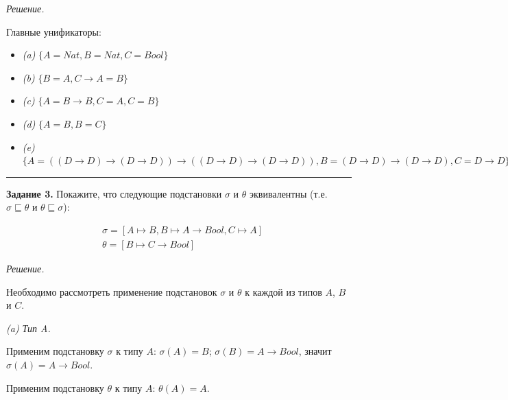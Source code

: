 \documentclass[landscape, 11pt]{report}
\begin{document}
	\textit{Решение.}	
	
	\vspace{0.2cm}
	
	Главные унификаторы:
	
	\begin{itemize}
		\item[] \textit{(a)} $\{A = Nat, B = Nat, C = Bool\}$
		\item[] \textit{(b)} $\{B =A, C \rightarrow A = B\}$
		\item[] \textit{(c)} $\{A = B \rightarrow B, C = A, C = B\}$
		\item[] \textit{(d)} $\{A = B, B = C\}$
		\item[] \textit{(e)} $\{A = \left((D \rightarrow D) \rightarrow (D \rightarrow D)\right) \rightarrow \left((D \rightarrow D) \rightarrow (D \rightarrow D)\right), B = (D \rightarrow D) \rightarrow (D \rightarrow D), C = D \rightarrow D\}$
	\end{itemize}
	
	\hrule
	\vspace{0.5cm}
	
	
	\textbf{Задание 3.} Покажите, что следующие подстановки $\sigma$ и $\theta$ эквивалентны (т.е. $\sigma \sqsubseteq \theta$ и $\theta \sqsubseteq \sigma$):
	
	\vspace{-0.5cm}
	
	\begin{align*}
		& \sigma = [A \mapsto B, B \mapsto A \to Bool, C \mapsto A] \\
		& \theta = [B \mapsto C \to Bool]
	\end{align*}
	
	\newpage
	
	\textit{Решение.}
	
	\vspace{0.2cm}
	
	Необходимо рассмотреть применение подстановок $\sigma$ и $\theta$ к каждой из типов $A$, $B$ и $C$.
	
	\vspace{0.15cm}
	
	\textit{(a) Тип A.}
	
	\vspace{0.15cm}
	
	Применим подстановку $\sigma$ к типу $A$: $\sigma(A) = B$; $\sigma(B) = A \rightarrow Bool$, значит $\sigma(A) = A \rightarrow Bool$.
	
	Применим подстановку $\theta$ к типу $A$: $\theta(A) = A$.
	
\end{document}
